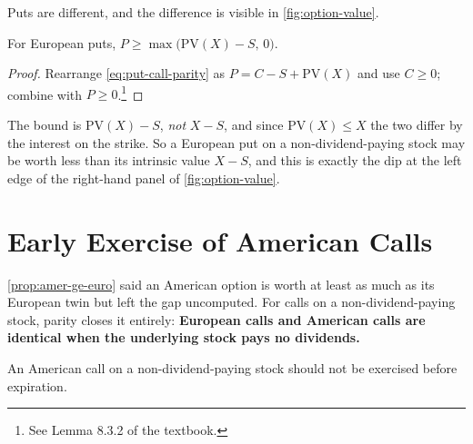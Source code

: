 Puts are different, and the difference is visible in \autoref{fig:option-value}.

\begin{lemma}
	\label{lem:put-bound}
	For European puts, $P\ge\max\bigl(\mathrm{PV}(X)-S,\,0\bigr)$.
\end{lemma}

\suppstart
\begin{proof}
	Rearrange \eqref{eq:put-call-parity} as $P=C-S+\mathrm{PV}(X)$ and use $C\ge 0$; combine with $P\ge 0$.\footnote{See Lemma 8.3.2 of the textbook.}
\end{proof}

\begin{note}
	The bound is $\mathrm{PV}(X)-S$, \emph{not} $X-S$, and since $\mathrm{PV}(X)\le X$ the two differ by the interest on the strike.
	So a European put on a non-dividend-paying stock may be worth less than its intrinsic value $X-S$, and this is exactly the dip at the left edge of the right-hand panel of \autoref{fig:option-value}.
\end{note}
\suppend

\section{Early Exercise of American Calls}
\label{sec:early-exercise}


\suppstart
\autoref{prop:amer-ge-euro} said an American option is worth at least as much as its European twin but left the gap uncomputed.
\suppend
For calls on a non-dividend-paying stock, parity closes it entirely: \textbf{European calls and American calls are identical when the underlying stock pays no dividends.}

\begin{theorem}[Merton, 1973]
	\label{thm:merton-no-early}
	An American call on a non-dividend-paying stock should not be exercised before expiration.
\end{theorem}


